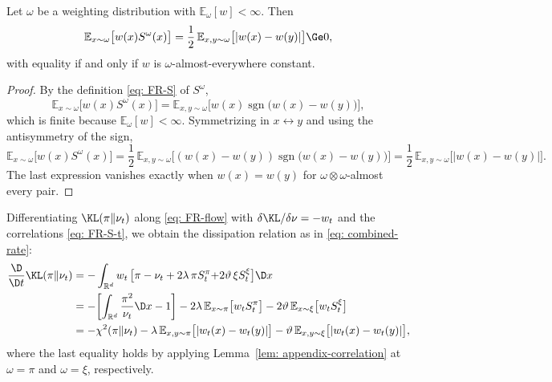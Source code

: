 \documentclass{article}
\begin{document}
\begin{lemma}
\label{lem: appendix-correlation}
Let $\omega$ be a weighting distribution with $\mathbb E_{\omega}[w]<\infty$. Then
\begin{equation}
    \mathbb E_{x\sim\omega}\bigl[w(x)S^{\omega}(x)\bigr]
    = \frac12\,\mathbb E_{x,y\sim\omega}\bigl[|w(x)-w(y)|\bigr] \Ge 0 ,
    \label{eq: appendix-correlation}
\end{equation}
with equality if and only if $w$ is $\omega$-almost-everywhere constant.
\end{lemma}

\begin{proof}
By the definition \eqref{eq: FR-S} of $S^{\omega}$,
\begin{equation*}
    \mathbb E_{x\sim\omega}\bigl[w(x)S^{\omega}(x)\bigr]
    = \mathbb E_{x,y\sim\omega}\bigl[w(x)\operatorname{sgn}\bigl(w(x)-w(y)\bigr)\bigr] ,
\end{equation*}
which is finite because $\mathbb E_\omega[w]<\infty$. Symmetrizing in $x\leftrightarrow y$ and using the antisymmetry of the sign,
\begin{equation*}
    \mathbb E_{x\sim\omega}\bigl[w(x)S^{\omega}(x)\bigr]
    = \frac12\,\mathbb E_{x,y\sim\omega}\bigl[(w(x)-w(y))\operatorname{sgn}\bigl(w(x)-w(y)\bigr)\bigr]
    = \frac12\,\mathbb E_{x,y\sim\omega}\bigl[|w(x)-w(y)|\bigr] .
\end{equation*}
The last expression vanishes exactly when $w(x)=w(y)$ for $\omega\otimes\omega$-almost every pair.
\end{proof}

Differentiating $\KL(\pi\|\nu_t)$ along \eqref{eq: FR-flow} with $\delta\KL/\delta\nu = -w_t$ and the correlations \eqref{eq: FR-S-t}, we obtain the dissipation relation as in \eqref{eq: combined-rate}:
\begin{align*}
    \frac{\D}{\D t}\KL(\pi\|\nu_t)
    &= -\int_{\mathbb R^d} w_t\,\bigl[\pi-\nu_t+2\lambda\,\pi S^{\pi}_t{+2\vartheta\,\xi S^{\xi}_t}\bigr]\D x \\
    &= -\biggl[\int_{\mathbb R^d}\frac{\pi^2}{\nu_t}\D x - 1\biggr]
       - 2\lambda\,\mathbb E_{x\sim\pi}\bigl[w_t S^{\pi}_t\bigr]
       - 2\vartheta\,\mathbb E_{x\sim\xi}\bigl[w_t S^{\xi}_t\bigr] \\
    & = -\chi^2(\pi\|\nu_t) - \lambda\,\mathbb E_{x,y\sim\pi}\bigl[|w_t(x)-w_t(y)|\bigr]
    - \vartheta\,\mathbb E_{x,y\sim\xi}\bigl[|w_t(x)-w_t(y)|\bigr],
\end{align*}
where the last equality holds by applying Lemma~\ref{lem: appendix-correlation} at $\omega = \pi$ and $\omega = \xi$, respectively.
\end{document}
